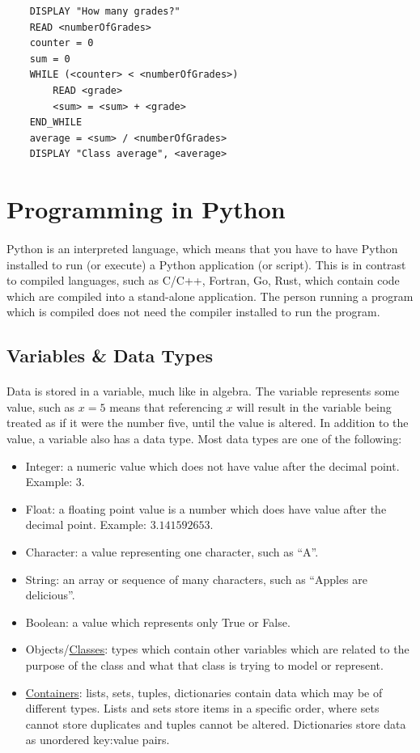 \documentclass[letter,10pt]{article}
\begin{document}
\begin{verbatim}
    DISPLAY "How many grades?"
    READ <numberOfGrades>
    counter = 0
    sum = 0
    WHILE (<counter> < <numberOfGrades>)
        READ <grade>
        <sum> = <sum> + <grade>
    END_WHILE
    average = <sum> / <numberOfGrades>
    DISPLAY "Class average", <average>
\end{verbatim}

\section{Programming in Python}
\paragraph{}Python is an interpreted language, which means that you have to have Python installed to run (or execute) a Python application (or script). This is in contrast to compiled languages, such as C/C++, Fortran, Go, Rust, which contain code which are compiled into a stand-alone application. The person running a program which is compiled does not need the compiler installed to run the program.

\subsection{Variables \& Data Types}
\paragraph{}Data is stored in a variable, much like in algebra. The variable represents some value, such as $x = 5$ means that referencing $x$ will result in the variable being treated as if it were the number five, until the value is altered. In addition to the value, a variable also has a data type. Most data types are one of the following:

\begin{itemize}
    \item Integer: a numeric value which does not have value after the decimal point. Example: $3$.
    \item Float: a floating point value is a number which does have value after the decimal point. Example: $3.141592653$.
    \item Character: a value representing one character, such as ``A''.
    \item String: an array or sequence of many characters, such as ``Apples are delicious''.
    \item Boolean: a value which represents only True or False.
    \item Objects/\hyperref[sec:classes]{Classes}: types which contain other variables which are related to the purpose of the class and what that class is trying to model or represent.
    \item \hyperref[sec:containers]{Containers}: lists, sets, tuples, dictionaries contain data which may be of different types. Lists and sets store items in a specific order, where sets cannot store duplicates and tuples cannot be altered. Dictionaries store data as unordered key:value pairs.
\end{itemize}
\end{document}
